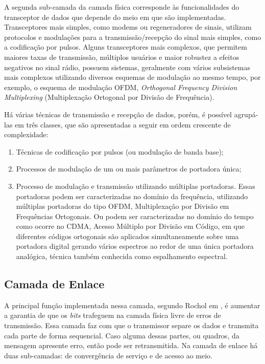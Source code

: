 A segunda sub-camada da camada física corresponde às funcionalidades do transceptor de dados que depende do meio em que são implementadas. Transceptores mais simples, como modems ou regeneradores de sinais, utilizam protocolos e modulações para a transmissão/recepção do sinal mais simples, como a codificação por pulsos. Alguns transceptores mais complexos, que permitem maiores taxas de transmissão, múltiplos usuários e maior robustez a efeitos negativos no sinal rádio, possuem sistemas, geralmente com vários subsistemas mais complexos utilizando diversos esquemas de modulação ao mesmo tempo, por exemplo, o esquema de modulação OFDM, \emph{Orthogonal Frequency Division Multiplexing} (Multiplexação Ortogonal por Divisão de Frequência).


Há várias técnicas de transmissão e recepção de dados, porém, é possível agrupá-las em três classes, que são apresentadas a seguir em ordem crescente de complexidade:
\begin{enumerate}
	\item Técnicas de codificação por pulsos (ou modulação de banda base);
	\item Processos de modulação de um ou mais parâmetros de portadora única;
	\item Processo de modulação e transmissão utilizando múltiplas portadoras. Essas portadoras podem ser caracterizadas no domínio da frequência, utilizando múltiplas portadoras do tipo OFDM, Multiplexação por Divisão em Frequências Ortogonais. Ou podem ser caracterizadas no domínio do tempo como ocorre no CDMA, Acesso Múltiplo por Divisão em Código, em que diferentes códigos ortogonais são aplicados simultaneamente sobre uma portadora digital gerando vários espectros ao redor de uma única portadora analógica, técnica também conhecida como espalhamento espectral.
\end{enumerate}

\subsection{Camada de Enlace}
A principal função implementada nessa camada, segundo Rochol em \cite{rochol2018sistemas}, é aumentar a garantia de que os \emph{bits} trafeguem na camada física livre de erros de transmissão. Essa camada faz com que o transmissor separe os dados e transmita cada parte de forma sequencial. Caso alguma dessas partes, ou quadros, da mensagem apresente erro, então pode ser retransmitida. Na camada de enlace há duas sub-camadas: de convergência de serviço e de acesso ao meio.

